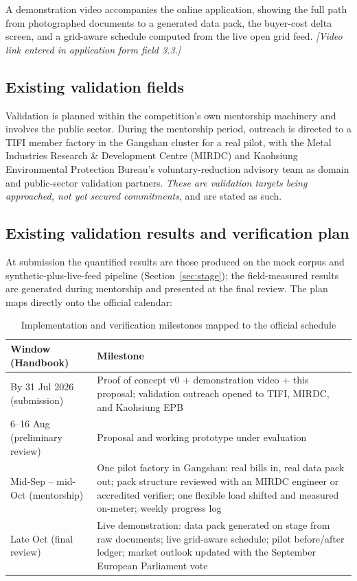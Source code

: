 A demonstration video accompanies the online application, showing the full
path from photographed documents to a generated data pack, the buyer-cost delta
screen, and a grid-aware schedule computed from the live open grid feed.
\emph{[Video link entered in application form field 3.3.]}

\subsection{Existing validation fields}\label{sec:valfields}

Validation is planned within the competition's own mentorship machinery and
involves the public sector. During the mentorship period, outreach is directed
to a TIFI member factory in the Gangshan cluster for a real pilot, with the
Metal Industries Research \& Development Centre (MIRDC) and Kaohsiung
Environmental Protection Bureau's voluntary-reduction advisory team as domain
and public-sector validation partners. \emph{These are validation targets being
approached, not yet secured commitments}, and are stated as such.

\subsection{Existing validation results and verification plan}\label{sec:valresults}

At submission the quantified results are those produced on the mock corpus and
synthetic-plus-live-feed pipeline (Section~\ref{sec:stage}); the field-measured
results are generated during mentorship and presented at the final review. The
plan maps directly onto the official calendar\cite{handbook}:

\begin{table}[htbp]
\caption{Implementation and verification milestones mapped to the official schedule}
\label{tab:plan}
\small
\begin{tabularx}{\textwidth}{@{}p{}X@{}}
\toprule
\textbf{Window (Handbook)} & \textbf{Milestone} \\
\midrule
By 31 Jul 2026 (submission) & Proof of concept v0 + demonstration video + this proposal; validation outreach opened to TIFI, MIRDC, and Kaohsiung EPB \\
6--16 Aug (preliminary review) & Proposal and working prototype under evaluation \\
Mid-Sep -- mid-Oct (mentorship) & One pilot factory in Gangshan: real bills in, real data pack out; pack structure reviewed with an MIRDC engineer or accredited verifier; one flexible load shifted and measured on-meter; weekly progress log \\
Late Oct (final review) & Live demonstration: data pack generated on stage from raw documents; live grid-aware schedule; pilot before/after ledger; market outlook updated with the September European Parliament vote\cite{akin} \\
\bottomrule
\end{tabularx}
\end{table}

